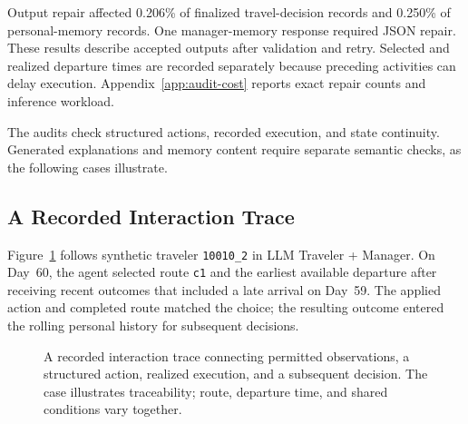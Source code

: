 Output repair affected 0.206\% of finalized travel-decision records and 0.250\% of personal-memory records. One manager-memory response required JSON repair. These results describe accepted outputs after validation and retry. Selected and realized departure times are recorded separately because preceding activities can delay execution. Appendix~\ref{app:audit-cost} reports exact repair counts and inference workload.

The audits check structured actions, recorded execution, and state continuity. Generated explanations and memory content require separate semantic checks, as the following cases illustrate.


\subsection{A Recorded Interaction Trace}
\label{sec:interaction-trace}

Figure~\ref{fig:execution-trace} follows synthetic traveler \texttt{10010\_2} in LLM Traveler + Manager. On Day~60, the agent selected route \texttt{c1} and the earliest available departure after receiving recent outcomes that included a late arrival on Day~59. The applied action and completed route matched the choice; the resulting outcome entered the rolling personal history for subsequent decisions.

\begin{figure}[!htbp]
\centering\small
{}
\caption{A recorded interaction trace connecting permitted observations, a structured action, realized execution, and a subsequent decision. The case illustrates traceability; route, departure time, and shared conditions vary together.}
\label{fig:execution-trace}
\end{figure}

